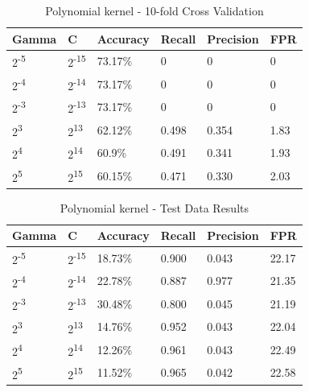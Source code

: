 \documentclass[conference]{IEEEtran}
\begin{document}
\begin{table}[!h]
\caption{Polynomial kernel - 10-fold Cross Validation}
\begin{center}
\begin{tabular}{ | l | l | l | l | l | l |}
\hline
Gamma & C & Accuracy & Recall & Precision & FPR \\
\hline\hline
2\textsuperscript{-5} & 2\textsuperscript{-15} & 73.17\% & 0 & 0 & 0 \\
\hline
2\textsuperscript{-4} & 2\textsuperscript{-14} & 73.17\% & 0 & 0 & 0 \\
\hline
2\textsuperscript{-3} & 2\textsuperscript{-13} & 73.17\% & 0 & 0 & 0 \\
\hline
2\textsuperscript{3} & 2\textsuperscript{13} & 62.12\% & 0.498 & 0.354 & 1.83 \\
\hline
2\textsuperscript{4} & 2\textsuperscript{14} & 60.9\% & 0.491 & 0.341 & 1.93 \\
\hline
2\textsuperscript{5} & 2\textsuperscript{15} & 60.15\% & 0.471 & 0.330 & 2.03 \\
\hline
\end{tabular}
\end{center}
\end{table}


 \begin{table}[!h]
\caption{Polynomial kernel - Test Data Results}
\begin{center}
\begin{tabular}{ | l | l | l | l | l | l |}
\hline
Gamma & C & Accuracy & Recall & Precision & FPR \\
\hline\hline
2\textsuperscript{-5} & 2\textsuperscript{-15} & 18.73\% & 0.900 & 0.043 & 22.17 \\
\hline
2\textsuperscript{-4} & 2\textsuperscript{-14} & 22.78\% & 0.887 & 0.977 & 21.35 \\
\hline
2\textsuperscript{-3} & 2\textsuperscript{-13} & 30.48\% & 0.800 & 0.045 & 21.19 \\
\hline
2\textsuperscript{3} & 2\textsuperscript{13} & 14.76\% & 0.952 & 0.043 & 22.04 \\
\hline
2\textsuperscript{4} & 2\textsuperscript{14} & 12.26\% & 0.961 & 0.043 & 22.49 \\
\hline
2\textsuperscript{5} & 2\textsuperscript{15} & 11.52\% & 0.965 & 0.042 & 22.58 \\
\hline
\end{tabular}
\end{center}
\end{table}
 
\end{document}
